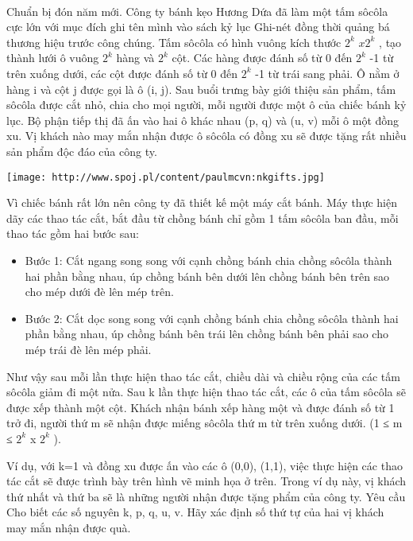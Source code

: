  

Chuẩn bị đón năm mới. Công ty bánh kẹo Hương Dứa đã làm một tấm sôcôla cực lớn với mục đích ghi tên mình vào sách kỷ lục Ghi-nét đồng thời quảng bá thương hiệu trước công chúng. Tấm sôcôla có hình vuông kích thước $2^{k}$ $x2^{k}$ , tạo thành lưới ô vuông $2^{k}$ hàng và $2^{k}$ cột. Các hàng được đánh số từ 0 đến $2^{k}$ -1 từ trên xuống dưới, các cột được đánh số từ 0 đến $2^{k}$ -1 từ trái sang phải. Ô nằm ở hàng i và cột j được gọi là ô (i, j). Sau buổi trưng bày giới thiệu sản phẩm, tấm sôcôla được cắt nhỏ, chia cho mọi người, mỗi người được một ô của chiếc bánh kỷ lục. Bộ phận tiếp thị đã ấn vào hai ô khác nhau (p, q) và (u, v) mỗi ô một đồng xu. Vị khách nào may mắn nhận được ô sôcôla có đồng xu sẽ được tặng rất nhiều sản phẩm độc đáo của công ty.


\texttt{[image: http://www.spoj.pl/content/paulmcvn:nkgifts.jpg]}

Vì chiếc bánh rất lớn nên công ty đã thiết kế một máy cắt bánh. Máy thực hiện dãy các thao tác cắt, bắt đầu từ chồng bánh chỉ gồm 1 tấm sôcôla ban đầu, mỗi thao tác gồm hai bước sau:
\begin{itemize}
	\item Bước 1: Cắt ngang song song với cạnh chồng bánh chia chồng sôcôla thành hai phần bằng nhau, úp chồng bánh bên dưới lên chồng bánh bên trên sao cho mép dưới đè lên mép trên.
	\item Bước 2: Cắt dọc song song với cạnh chồng bánh chia chồng sôcôla thành hai phần bằng nhau, úp chồng bánh bên trái lên chồng bánh bên phải sao cho mép trái đè lên mép phải.
\end{itemize}

Như vậy sau mỗi lần thực hiện thao tác cắt, chiều dài và chiều rộng của các tấm sôcôla giảm đi một nửa. Sau k lần thực hiện thao tác cắt, các ô của tấm sôcôla sẽ được xếp thành một cột. Khách nhận bánh xếp hàng một và được đánh số từ 1 trở đi, người thứ m sẽ nhận được miếng sôcôla thứ m từ trên xuống dưới. (1 ≤ m ≤ $2^{k}$ x $2^{k}$ ).

Ví dụ, với k=1 và đồng xu được ấn vào các ô (0,0), (1,1), việc thực hiện các thao tác cắt sẽ được trình bày trên hình vẽ minh họa ở trên. Trong ví dụ này, vị khách thứ nhất và thứ ba sẽ là những người nhận được tặng phẩm của công ty.
Yêu cầu
Cho biết các số nguyên k, p, q, u, v. Hãy xác định số thứ tự của hai vị khách may mắn nhận được quà.